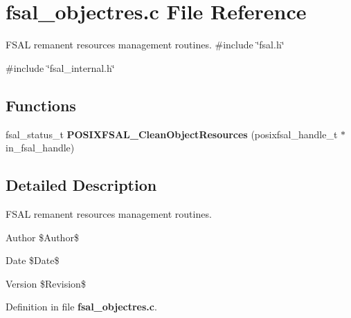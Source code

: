 \section{fsal\_\-objectres.c File Reference}
\label{fsal__objectres_8c}


FSAL remanent resources management routines.  
{\ttfamily \#include \char`\"{}fsal.h\char`\"{}}\par
{\ttfamily \#include \char`\"{}fsal\_\-internal.h\char`\"{}}\par
\subsection*{Functions}
\begin{DoxyCompactItemize}
\item 
fsal\_\-status\_\-t {\bfseries POSIXFSAL\_\-CleanObjectResources} (posixfsal\_\-handle\_\-t $\ast$in\_\-fsal\_\-handle)\label{fsal__objectres_8c_a94b853a4a81970726a4655a7bedc749a}

\end{DoxyCompactItemize}


\subsection{Detailed Description}
FSAL remanent resources management routines. \begin{DoxyAuthor}{Author}
\$Author\$ 
\end{DoxyAuthor}
\begin{DoxyDate}{Date}
\$Date\$ 
\end{DoxyDate}
\begin{DoxyVersion}{Version}
\$Revision\$ 
\end{DoxyVersion}


Definition in file {\bf fsal\_\-objectres.c}.